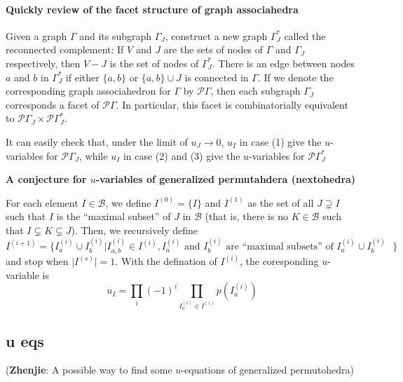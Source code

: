 \documentclass[hidelinks,12pt]{article}
\begin{document}
\paragraph{Quickly review of the facet structure of graph associahedra} Given a graph $\Gamma$ and its subgraph $\Gamma_{J}$, construct a new graph $\Gamma_{J}^{\ast}$ called the reconnected complement: If $V$ and $J$ are the sets of nodes of $\Gamma$ and $\Gamma_{J}$ respectively, then $V-J$ is the set of nodes of $\Gamma_{J}^{\ast}$. There is an edge between nodes $a$ and $b$ in $\Gamma_{J}^{\ast}$ if either $\{a, b\}$ or $\{a, b\}\cup J$ is connected in $\Gamma$. If we denote the corresponding graph associahedron for $\Gamma$ by $\mathcal{P}\Gamma$, then each subgraph $\Gamma_{J}$ corresponds a facet of $\mathcal{P}\Gamma$. In particular, this facet is combinatorially equivalent to $\mathcal{P}\Gamma_{J}\times \mathcal{P}\Gamma_{J}^{\ast}$\cite{}.

It can easily check that, under the limit of $u_{J}\to 0$, $u_{I}$ in case (1) give the $u$-variables for $\mathcal{P}\Gamma_{J}$, while  $u_{I}$ in case (2) and (3) give the $u$-variables for $\mathcal{P}\Gamma_{J}^{\ast}$

{\bf A conjecture for $u$-variables of generalized permutahdera (nextohedra)}

For each element $ I\in \mathcal B$, we define $I^{(0)}=\{I\}$ and  $I^{(1)}$ as the set of all $J\supsetneq I $ such that  $I$ is the ``maximal subset'' of $J$ in $\mathcal{B}$ (that is, there is no $K\in \mathcal{B}$ such that $I\subsetneq K\subsetneq J $). Then, we recursively define 
\begin{equation}
   I^{(i+1)} = \{I^{(i)}_{a}\cup I^{(i)}_{b}\vert I_{a,b}^{(i)}\in I^{(i)},\text{$I_{a}^{(i)}$ and $I_{b}^{(i)}$ are ``maximal subsets'' of $I^{(i)}_{a}\cup I^{(i)}_{b}$ }\}
\end{equation} 
and stop when $\lvert I^{(s)}\rvert =1$. With the defination of $I^{(i)}$, the coresponding $u$-variable is
\begin{equation}
   u_{I} =\prod_{i}(-1)^{i} \prod_{I_{a}^{(i)}\in I^{(i)}} p(I_{a}^{(i)})
\end{equation}

\subsection{u eqs}

({\bf Zhenjie}: A possible way to find some $u$-equations of generalized permutohedra)
\end{document}
